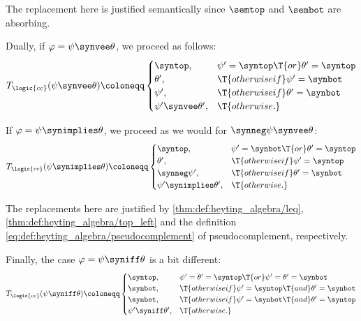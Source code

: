 \begin{algorithm}
\begin{thmenum}
    The replacement here is justified semantically since \( \semtop \) and \( \sembot \) are absorbing.

     Dually, if \( \varphi = \psi \synvee \theta \), we proceed as follows:
    \begin{equation*}
      T_{\logic{cc}}(\psi \synvee \theta) \coloneqq \begin{cases}
        \syntop,                   &\psi' = \syntop \T{or} \theta' = \syntop \\
        \theta',                   &\T{otherwise if} \psi' = \synbot \\
        \psi',                     &\T{otherwise if} \theta' = \synbot \\
        \psi' \synvee \theta',     &\T{otherwise.}
      \end{cases}
    \end{equation*}

     If \( \varphi = \psi \synimplies \theta \), we proceed as we would for \( \synneg \psi \synvee \theta \):
    \begin{equation*}
      T_{\logic{cc}}(\psi \synimplies \theta) \coloneqq \begin{cases}
        \syntop,                   &\psi' = \synbot \T{or} \theta' = \syntop \\
        \theta',                   &\T{otherwise if} \psi' = \syntop \\
        \synneg \psi',             &\T{otherwise if} \theta' = \synbot \\
        \psi' \synimplies \theta', &\T{otherwise.}
      \end{cases}
    \end{equation*}

    The replacements here are justified by \cref{thm:def:heyting_algebra/leq}, \cref{thm:def:heyting_algebra/top_left} and the definition \eqref{eq:def:heyting_algebra/pseudocomplement} of pseudocomplement, respectively.

     Finally, the case \( \varphi = \psi \syniff \theta \) is a bit different:
    \begin{equation*}
      T_{\logic{cc}}(\psi \syniff \theta) \coloneqq \begin{cases}
        \syntop,                   &\psi' = \theta' = \syntop \T{or} \psi' = \theta' = \synbot \\
        \synbot,                   &\T{otherwise if} \psi' = \syntop \T{and} \theta' = \synbot \\
        \synbot,                   &\T{otherwise if} \psi' = \synbot \T{and} \theta' = \syntop \\
        \psi' \syniff \theta',     &\T{otherwise.}
      \end{cases}
    \end{equation*}
  \end{thmenum}
\end{algorithm}
